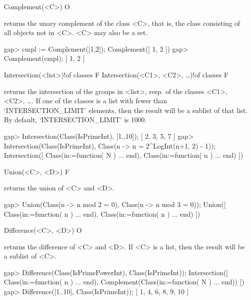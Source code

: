 
\>Complement(<C>) O

returns the unary complement of the class <C>, that is, the class consisting
of all objects not in <C>. <C> may also be a set.

\beginexample
gap> cmpl := Complement([1,2]);
Complement([ 1, 2 ])
gap> Complement(cmpl);
[ 1, 2 ]
\endexample

\>Intersection(<list>)!{of classes} F
\>Intersection(<C1>, <C2>, \dots)!{of classes} F
\relax

returns the intersection of the groups in <list>, resp. of the classes
<C1>, <C2>, \dots. If one of the classes is a list with fewer than
`INTERSECTION_LIMIT' elements, then the result will be
a sublist of that list. By default, `INTERSECTION_LIMIT' is 1000. 

\beginexample
gap> Intersection(Class(IsPrimeInt), [1..10]);
[ 2, 3, 5, 7 ]
gap> Intersection(Class(IsPrimeInt), Class(n -> n = 2^LogInt(n+1, 2) - 1));
Intersection([ Class(in:=function( N ) ... end), 
  Class(in:=function( n ) ... end) ])
\endexample

\>Union(<C>, <D>) F

returns the union of <C> and <D>.  

\beginexample
gap> Union(Class(n -> n mod 2 = 0), Class(n -> n mod 3 = 0));
Union([ Class(in:=function( n ) ... end), Class(in:=function( n ) ... end) 
 ])
\endexample

\>Difference(<C>, <D>) O

returns the difference of <C> and <D>. If <C> is a list, then the
result will be a sublist of <C>.

\beginexample
gap> Difference(Class(IsPrimePowerInt), Class(IsPrimeInt));
Intersection([ Class(in:=function( n ) ... end), 
  Complement(Class(in:=function( N ) ... end)) ])
gap> Difference([1..10], Class(IsPrimeInt));
[ 1, 4, 6, 8, 9, 10 ]
\endexample


